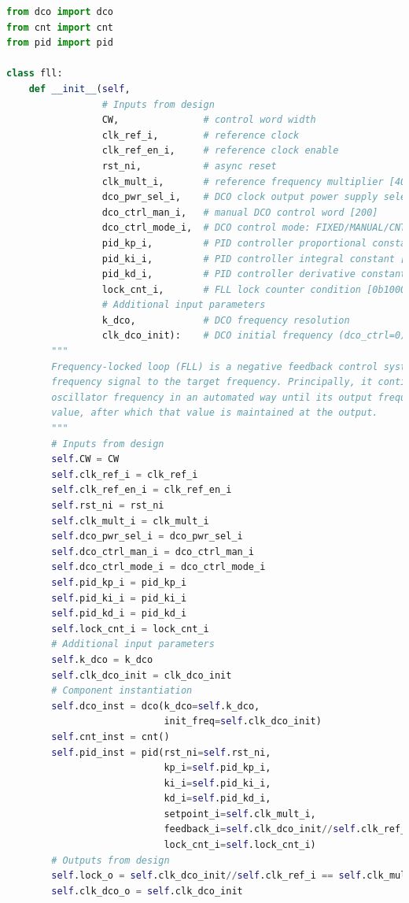 \documentclass[master]{finthesis}
\def \FLL  {FLL} %
\begin{document}
\begin{lstlisting}[language=Python, caption={Имплементација модела \FLL\ компоненте.}, label={lst:py:fll}]
from dco import dco
from cnt import cnt
from pid import pid

class fll:
    def __init__(self,
                 # Inputs from design
                 CW,               # control word width
                 clk_ref_i,        # reference clock
                 clk_ref_en_i,     # reference clock enable
                 rst_ni,           # async reset
                 clk_mult_i,       # reference frequency multiplier [40]
                 dco_pwr_sel_i,    # DCO clock output power supply selection: VDDL/VDD [0/1]
                 dco_ctrl_man_i,   # manual DCO control word [200]
                 dco_ctrl_mode_i,  # DCO control mode: FIXED/MANUAL/CNT/PID [PID=3/CNT=2]
                 pid_kp_i,         # PID controller proportional constant [0b01000000]
                 pid_ki_i,         # PID controller integral constant [0b01000000]
                 pid_kd_i,         # PID controller derivative constant [0]
                 lock_cnt_i,       # FLL lock counter condition [0b1000]
                 # Additional input parameters
                 k_dco,            # DCO frequency resolution
                 clk_dco_init):    # DCO initial frequency (dco_ctrl=0) 
        """
        Frequency-locked loop (FLL) is a negative feedback control system that locks the output
        frequency signal to the target frequency. Principally, it continuously controls the
        oscillator frequency in an automated way until its output frequency matches the target
        value, after which that value is maintained at the output.
        """
        # Inputs from design
        self.CW = CW
        self.clk_ref_i = clk_ref_i 
        self.clk_ref_en_i = clk_ref_en_i
        self.rst_ni = rst_ni
        self.clk_mult_i = clk_mult_i
        self.dco_pwr_sel_i = dco_pwr_sel_i  
        self.dco_ctrl_man_i = dco_ctrl_man_i
        self.dco_ctrl_mode_i = dco_ctrl_mode_i 
        self.pid_kp_i = pid_kp_i
        self.pid_ki_i = pid_ki_i
        self.pid_kd_i = pid_kd_i
        self.lock_cnt_i = lock_cnt_i
        # Additional input parameters
        self.k_dco = k_dco
        self.clk_dco_init = clk_dco_init
        # Component instantiation
        self.dco_inst = dco(k_dco=self.k_dco,
                            init_freq=self.clk_dco_init)
        self.cnt_inst = cnt()
        self.pid_inst = pid(rst_ni=self.rst_ni,
                            kp_i=self.pid_kp_i,
                            ki_i=self.pid_ki_i,
                            kd_i=self.pid_kd_i,
                            setpoint_i=self.clk_mult_i,
                            feedback_i=self.clk_dco_init//self.clk_ref_i,
                            lock_cnt_i=self.lock_cnt_i)
        # Outputs from design
        self.lock_o = self.clk_dco_init//self.clk_ref_i == self.clk_mult_i
        self.clk_dco_o = self.clk_dco_init


\end{lstlisting}
\end{document}
